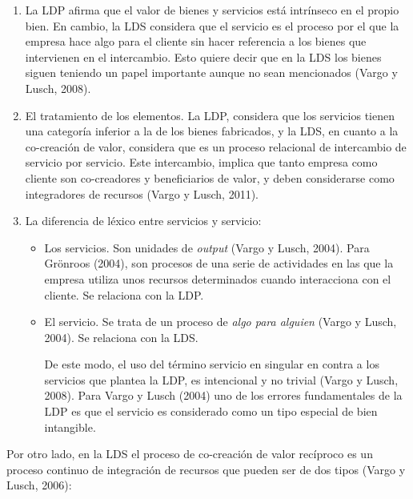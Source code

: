 \begin{enumerate} 
	\item La LDP afirma que el valor de bienes y servicios está intrínseco en el propio bien. En cambio, la LDS considera que el servicio es el proceso por el que la empresa hace algo para el cliente sin hacer referencia a los bienes que intervienen en el intercambio. Esto quiere decir que en la LDS los bienes siguen teniendo un papel importante aunque no sean mencionados (Vargo y Lusch, 2008). 
	\item El tratamiento de los elementos. La LDP, considera que los servicios tienen una categoría inferior a la de los bienes fabricados, y la LDS, en cuanto a la co-creación de valor, considera que es un proceso relacional de intercambio de servicio por servicio. Este intercambio, implica que tanto empresa como cliente son co-creadores y beneficiarios de valor, y deben considerarse como integradores de recursos (Vargo y Lusch, 2011). 
	\item La diferencia de léxico entre servicios y servicio: 
		\begin{itemize} 
			\item Los servicios. Son unidades de \emph{output} (Vargo y Lusch, 2004). Para Grönroos (2004), son procesos de una serie de actividades en las que la empresa utiliza unos recursos determinados cuando interacciona con el cliente. Se relaciona con la LDP.
			\item El servicio. Se trata de un proceso de \emph{algo para alguien} (Vargo y Lusch, 2004). Se relaciona con la LDS.

			De este modo, el uso del término servicio en singular en contra a los servicios que plantea la LDP, es intencional y no trivial (Vargo y Lusch, 2008). Para Vargo y Lusch (2004) uno de los errores fundamentales de la LDP es que el servicio es considerado como un tipo especial de bien intangible.
			\end{itemize}

\end{enumerate}

Por otro lado, en la LDS el proceso de co-creación de valor recíproco es un proceso continuo de integración de recursos que pueden ser de dos tipos (Vargo y Lusch, 2006):

